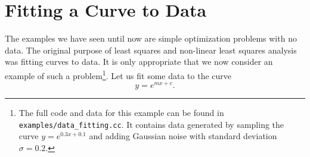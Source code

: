 \chapter{Fitting a Curve to Data}
\label{chapter:tutorial:curvefitting}
The examples we have seen until now are simple optimization problems with no data. The original purpose of least squares and non-linear least squares analysis was fitting curves to data. It is only appropriate that we now consider an example of such a problem\footnote{The full code and data for this example can be found in
\texttt{examples/data\_fitting.cc}. It contains data generated by sampling the curve $y = e^{0.3x + 0.1}$ and adding Gaussian noise with standard deviation $\sigma = 0.2$.}. Let us fit some data to the curve
\begin{equation}
	y = e^{mx + c}.
\end{equation}


